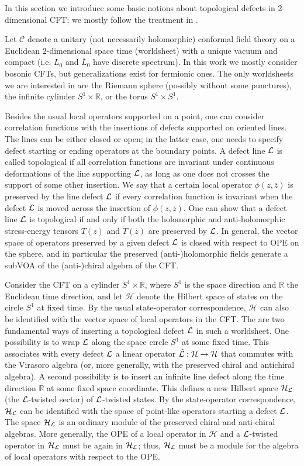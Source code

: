 \documentclass[11pt,reqno]{article}
\newcommand{\CH}{\mathcal{H}}
\newcommand{\CL}{{\cal L}}
\newcommand{\calC}{\mathcal{C}}
\newcommand{\RR}{\mathbb{R}}
\begin{document}
In this section we introduce some basic notions about topological defects in 2-dimensional CFT; we mostly follow the treatment in \cite{Chang_2019}.

Let $\calC$ denote a unitary (not necessarily holomorphic) conformal field theory on a Euclidean $2$-dimensional space time (worldsheet) with a unique vacuum and compact (i.e. $L_0$ and $\bar L_0$ have discrete spectrum). In this work we mostly consider bosonic CFTs, but generalizations exist for fermionic ones. The only worldsheets we are interested in are the Riemann sphere (possibly without some punctures), the infinite cylinder $S^1\times \RR$, or the torus $S^1\times S^1$.

Besides the usual local operators supported on a point, one can consider correlation functions with the insertions of defects supported on oriented lines. The lines can be either closed or open; in the latter case, one needs to specify defect starting or ending operators at the boundary points. A defect line $\CL$ is called topological if all correlation functions are invariant under continuous deformations of the line supporting $\CL$, as long as one does not crosses the support of some other insertion. We say that a certain local operator $\phi(z,\bar z)$ is preserved by the line defect $\CL$ if every correlation function is invariant when the defect $\CL$ is moved across the insertion of $\phi(z,\bar z)$. One can show that a defect line $\CL$ is topological if and only if both the holomorphic and anti-holomorphic stress-energy tensors $T(z)$ and $\tilde T(\bar z)$ are  preserved by $\CL$. In general, the vector space of operators preserved by a given defect $\CL$ is closed with respect to OPE on the sphere, and in particular the preserved (anti-)holomorphic fields generate a subVOA of the (anti-)chiral algebra of the CFT.

Consider the CFT on a cylinder $S^1\times \RR$, where $S^1$ is the space direction and $\RR$ the Euclidean time direction, and let $\CH$ denote the Hilbert space of states on the circle $S^1$ at fixed time. By the usual state-operator correspondence, $\CH$ can also be identified with the vector space of local operators in the CFT. The are two fundamental ways of inserting a topological defect $\CL$ in such a worldsheet. One possibility is to wrap $\CL$ along the space circle $S^1$ at some fixed time. This associates with every defect $\CL$  a linear operator $\hat\CL:\CH\to \CH$ that commutes with the Virasoro algebra (or, more generally, with the preserved chiral and antichiral algebra). A second possibility is to insert an infinite line defect along the time direction $\RR$ at some fixed space coordinate. This defines a new Hilbert space $\CH_\CL$ (the $\CL$-twisted sector) of $\CL$-twisted states. By the state-operator correspondence, $\CH_\CL$ can be identified with the space of point-like operators starting a defect $\CL$.   The space $\CH_\CL$ is an ordinary module of the preserved chiral and anti-chiral algebras. More generally, the OPE of a local operator in $\CH$ and a $\CL$-twisted operator in $\CH_\CL$ must be again in $\CH_\CL$; thus, $\CH_\CL$ must be a module for the algebra of local operators with respect to the OPE.
\end{document}
